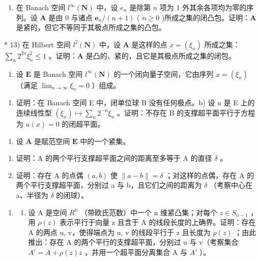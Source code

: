 \begin{enumerate}
\def\labelenumi{\arabic{enumi})}
\setcounter{enumi}{11}
\tightlist
\item
  在 Banach 空间 \(l^{\infty}(\mathbf{N})\) 中，设 \(e_n\) 是除第 \(n\) 项为 1 外其余各项均为零的序列。设 \(\mathbf{A}\) 是由 0 与诸点 \(\mathbf{e}_n / (n + 1)\) ( \(n \geqslant 0\) )所成之集的闭凸包。证明：\(\mathbf{A}\) 是紧的，但它不等同于其极点所成之集的凸包。
\end{enumerate}

* 13) 在 Hilbert 空间 \(l^2(\mathbf{N})\) 中，设 \(\mathbf{A}\) 是这样的点 \(x = (\xi_n)\) 所成之集：\(\sum_{n} 2^{2n}\xi_n^2 \leqslant 1\) 。证明：\(\mathbf{A}\) 是凸的、紧的，且它是其极点所成之集的闭包。

\begin{enumerate}
\def\labelenumi{\arabic{enumi})}
\setcounter{enumi}{13}
\tightlist
\item
  设 \(\mathbf{E}\) 是 Banach 空间 \(l^{\infty}(\mathbf{N})\) 的一个闭向量子空间，它由序列 \(x = (\xi_n)\) （满足 \(\lim_{n\to \infty}\xi_n = 0\) ）组成。
\end{enumerate}

\begin{enumerate}
\def\labelenumi{\alph{enumi})}
\tightlist
\item
  证明：在 Banach 空间 E 中，闭单位球 B 没有任何极点。b) 设 \(u\) 是 E 上的连续线性型 \((\xi_n) \mapsto \sum_n 2^{-n}\xi_n\) 。证明：不存在 B 的支撑超平面平行于方程为 \(u(x)=0\) 的闭超平面。
\end{enumerate}

\begin{enumerate}
\def\labelenumi{\arabic{enumi})}
\setcounter{enumi}{14}
\tightlist
\item
  设 \(\mathbf{A}\) 是赋范空间 \(\mathbf{E}\) 中的一个紧集。
\end{enumerate}

\begin{enumerate}
\def\labelenumi{\alph{enumi})}
\item
  证明：A 的两个平行支撑超平面之间的距离至多等于 A 的直径 \(\delta\) 。
\item
  证明：存在 A 的点偶 \((a, b)\) 使 \(\|a - b\| = \delta\) ；对这样的点偶，存在 A 的两个平行支撑超平面，分别过 a 与 b，且它们之间的距离为 \(\delta\) （考察中心在 a、半径为 \(\delta\) 的闭球）。
\end{enumerate}

\begin{enumerate}
\def\labelenumi{\arabic{enumi})}
\setcounter{enumi}{15}
\tightlist
\item
  \begin{enumerate}
  \def\labelenumii{\alph{enumii})}
  \tightlist
  \item
    设 A 是空间 \(R^{n}\) （带欧氏范数）中一个 n 维紧凸集；对每个 \(z \in S_{n-1}\) ，用 \(\rho(z)\) 表示平行于向量 z 且含于 A 的线段长度的上确界。证明：存在 A 的两点 u, v，使得端点为 u, v 的线段平行于 z 且长度为 \(\rho(z)\) ；由此推出：存在 A 的两个平行的支撑超平面，分别过 u 与 v（考察集合 \(A' = A + \rho(z)z\) ，并用一个超平面分离集合 A 与 \(A'\) ）。
  \end{enumerate}
\end{enumerate}

